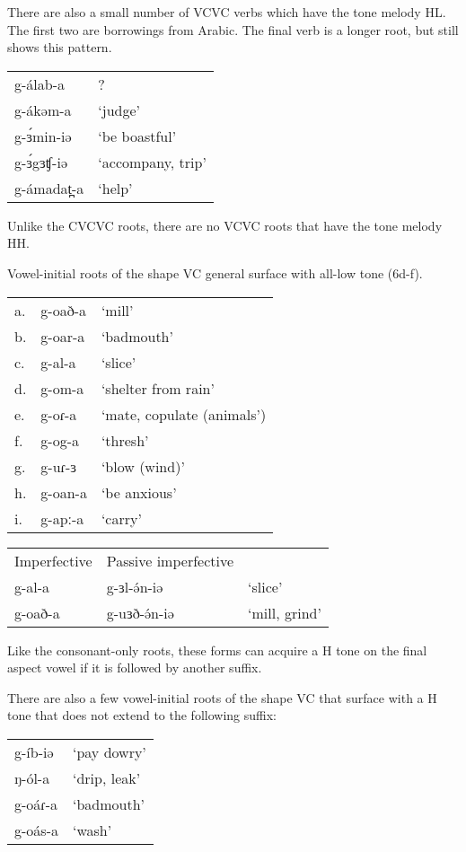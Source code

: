 There are also a small number of VCVC verbs which have the tone melody HL. The first two are borrowings from Arabic. The final verb is a longer root, but still shows this pattern. 

\ea 
\begin{tabular}[t]{ll}
g-álab-a	&	? \\%
g-ákəm-a	&	`judge'\\
g-ɜ́min-iə	&	`be boastful'\\
g-ɜ́gɜʧ-iə	&	`accompany, trip'\\
g-ámadat̪-a	&	`help'\\	
\end{tabular}
\z 

Unlike the CVCVC roots, there are no VCVC roots that have the tone melody HH.

Vowel-initial roots of the shape VC general surface with all-low tone (6d-f). 

\ea 
\begin{tabular}[t]{lll}
a.	&	g-oað-a	&	‘mill’\\
b.	&	g-oar-a	&	‘badmouth’\\
c.	&	g-al-a	&	‘slice’\\
d.	&	g-om-a	&	`shelter from rain'\\
e.	&	g-oɾ-a	&	`mate, copulate (animals')\\
f.	&	g-og-a	&	`thresh'\\
g.	&	g-uɾ-ɜ	&	`blow (wind)'\\
h.	&	g-oan-a	&	`be anxious'\\
i.	&	g-apː-a	&	`carry'\\	
\end{tabular}
\z 


\ea 
\begin{tabular}[t]{lll}
Imperfective	&	Passive imperfective	\\
g-al-a 	&	g-ɜl-ə́n-iə	&	‘slice’\\
g-oað-a	&	g-uɜð-ə́n-iə	&	‘mill, grind’\\	
\end{tabular}
\z 

Like the consonant-only roots, these forms can acquire a H tone on the final aspect vowel if it is followed by another suffix.

There are also a few vowel-initial roots of the shape VC that surface with a H tone that does not extend to the following suffix:

\ea 
\begin{tabular}[t]{ll}
g-íb-iə	&	‘pay dowry'\\
ŋ-ól-a	&	`drip, leak'\\
g-oáɾ-a	&	`badmouth'\\
g-oás-a	&	`wash'\\	
\end{tabular}
\z 

